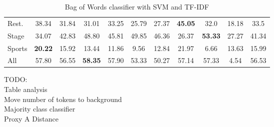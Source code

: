 \begin{table}[]
{\begin{tabular}{@{}lcccccccccc@{}}
		\multicolumn{1}{l|}{Rest.}      & 38.34                      & 31.84                     & 31.01                     & 33.25                          & 25.79                        & 27.37                     & \textbf{45.05}             & 32.0                      & 18.18                      & 33.5                   \\
		\multicolumn{1}{l|}{Stage}      & 34.07                       & 42.83                     & 48.80                    & 45.81                          & 49.85                        & 46.36                     & 26.37                     & \textbf{53.33}            & 27.27                      & 41.34                   \\
		\multicolumn{1}{l|}{Sports}     & \textbf{20.22}                      & 15.92                      & 13.44                    & 11.86                          & 9.56                        & 12.84                     & 21.97                      & 6.66                     & 13.63             & 15.99                    \\
		\multicolumn{1}{l|}{All}        & 57.80                      & 56.55                     & \textbf{58.35}            & 57.90                          & 53.33                        & 50.27                     & 57.14                     & 57.33                     & 4.54                      & 56.53                       
	\end{tabular}%
}
	\caption{Bag of Words classifier with SVM and TF-IDF}
	\label{tab:bow}
\end{table}

TODO:\\
Table analysis\\
Move number of tokens to background\\
Majority class classifier\\
Proxy A Distance\\
